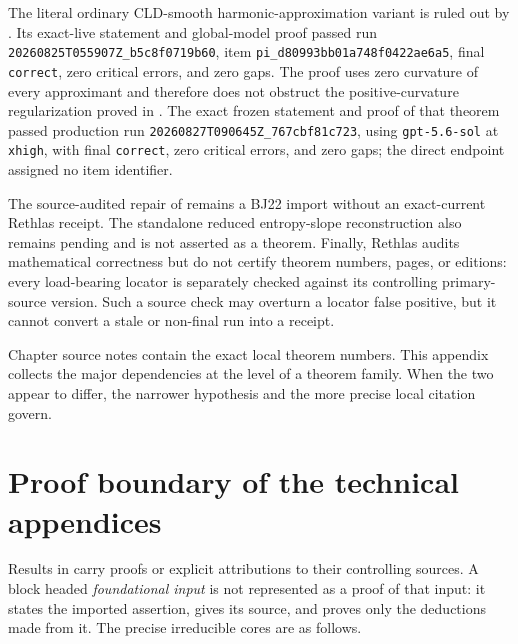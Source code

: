 The literal ordinary CLD-smooth harmonic-approximation variant is ruled out
by .  Its exact-live
statement and global-model proof passed run
\nolinkurl{20260825T055907Z_b5c8f0719b60}, item
\nolinkurl{pi_d80993bb01a748f0422ae6a5}, final \texttt{correct}, zero
critical errors, and zero gaps.  The proof uses zero curvature of every
approximant and therefore does not obstruct the positive-curvature
regularization proved in
.  The exact frozen
statement and proof of that theorem passed production run
\nolinkurl{20260827T090645Z_767cbf81c723}, using \texttt{gpt-5.6-sol} at
\texttt{xhigh}, with final \texttt{correct}, zero critical errors, and zero
gaps; the direct endpoint assigned no item identifier.

The source-audited repair of  remains a BJ22 import
without an exact-current Rethlas receipt.  The standalone reduced
entropy-slope reconstruction also remains pending and is not asserted as a
theorem.  Finally, Rethlas audits mathematical correctness but do not certify
theorem numbers, pages, or editions: every load-bearing locator is separately
checked against its controlling primary-source version.  Such a source check
may overturn a locator false positive, but it cannot convert a stale or
non-final run into a receipt.

\begin{remark}
\label{rem:appL-citations}
Chapter source notes contain the exact local theorem numbers.  This appendix
collects the major dependencies at the level of a theorem family.  When the
two appear to differ, the narrower hypothesis and the more precise local
citation govern.
\end{remark}

\section{Proof boundary of the technical appendices}
\label{sec:appL-appendix-proof-boundary}

Results in 
carry proofs or explicit attributions to their controlling sources.
A block headed \emph{foundational input} is
not represented as a proof of that input: it states the imported assertion,
gives its source, and proves only the deductions made from it.  The precise
irreducible cores are as follows.

